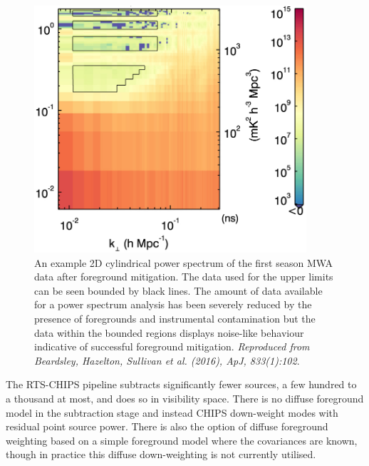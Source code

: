 \begin{figure}
\begin{center}
    \includegraphics[width=0.9\textwidth]{Chapman_Jelic/Images/apjaa3b64f13_hr.jpg}
\end{center}
    \caption{An example 2D cylindrical power spectrum of the first season MWA data after foreground mitigation. The data used for the upper limits can be seen bounded by black lines. The amount of data available for a power spectrum analysis has been severely reduced by the presence of foregrounds and instrumental contamination but the data within the bounded regions displays noise-like behaviour indicative of successful foreground mitigation. \textit{Reproduced from Beardsley, Hazelton, Sullivan et al. (2016), ApJ, 833(1):102}.}
    \label{fig:masks}
\end{figure}

The RTS-CHIPS pipeline subtracts significantly fewer sources, a few hundred to a thousand at most, and does so in visibility space. There is no diffuse foreground model in the subtraction stage and instead CHIPS down-weight modes with residual point source power. There is also the option of diffuse foreground weighting based on a simple foreground model where the covariances are known, though in practice this diffuse down-weighting is not currently utilised.

